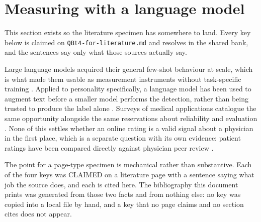 \section{Measuring with a language model}
\label{sec:llm-measurement}

This section exists so the literature specimen has somewhere to land. Every key
below is claimed on \texttt{QBt4-for-literature.md} and resolves in the shared
bank, and the sentences say only what those sources actually say.

Large language models acquired their general few-shot behaviour at scale, which
is what made them usable as measurement instruments without task-specific
training \citep{brown2020language}. Applied to personality specifically, a
language model has been used to augment text before a smaller model performs
the detection, rather than being trusted to produce the label alone
\citep{hu2024llm}. Surveys of medical applications catalogue the same
opportunity alongside the same reservations about reliability and evaluation
\citep{Nazi2024LLMHealthcare}. None of this settles whether an online rating is
a valid signal about a physician in the first place, which is a separate
question with its own evidence: patient ratings have been compared directly
against physician peer review \citep{mcgrath2018validity}.

The point for a page-type specimen is mechanical rather than substantive. Each
of the four keys was CLAIMED on a literature page with a sentence saying what
job the source does, and each is cited here. The bibliography this document
prints was generated from those two facts and from nothing else: no key was
copied into a local file by hand, and a key that no page claims and no section
cites does not appear.
